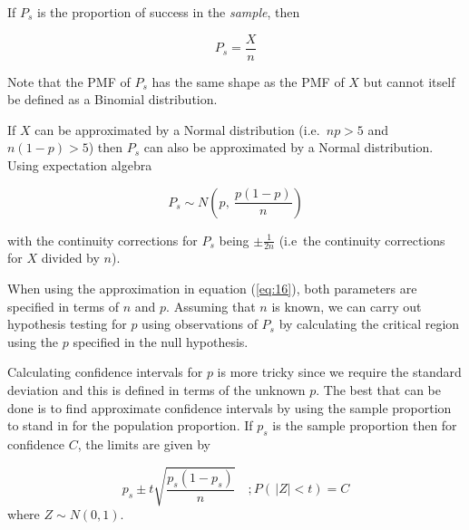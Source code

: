 \documentclass[a5paper]{article}
\begin{document}
If $P_s$ is the proportion of success in the \textit{sample}, then

\begin{equation}
  P_s = \frac{X}{n}
\end{equation}

Note that the PMF of $P_s$ has the same shape as the PMF of $X$ but cannot
itself be defined as a Binomial distribution.

If $X$ can be approximated by a Normal distribution (i.e.\ $np>5$ and
$n(1-p)>5$) then $P_s$ can also be approximated by a Normal distribution. Using
expectation algebra

\begin{equation}\label{eq:16}
  P_s\sim N\left(p,\ \frac{p(1-p)}{n}\right)
\end{equation}

\noindent with the continuity corrections for $P_s$ being $\pm\frac{1}{2n}$
(i.e\ the continuity corrections for $X$ divided by $n$).

When using the approximation in equation (\ref{eq:16}), both parameters are
specified in terms of $n$ and $p$. Assuming that $n$ is known, we can carry out
hypothesis testing for $p$ using observations of $P_s$ by calculating the
critical region using the $p$ specified in the null hypothesis.

Calculating confidence intervals for $p$ is more tricky since we require the
standard deviation and this is defined in terms of the unknown $p$. The best
that can be done is to find approximate confidence intervals by using the sample
proportion to stand in for the population proportion. If $p_s$ is the sample
proportion then for confidence $C$, the limits are given by

\begin{equation}
  p_s\pm t\sqrt{\frac{p_s(1-p_s)}{n}}\quad;P(\,|Z|<t)=C
\end{equation}
where $Z\sim N(0,1)$.
\end{document}
